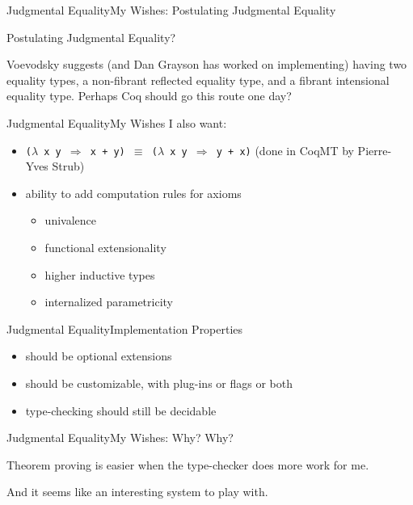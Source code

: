 \documentclass{beamer}
\begin{document}
\begin{frame}[fragile]{Judgmental Equality}{My Wishes: Postulating Judgmental Equality}
  \Large
  \begin{center}
    Postulating Judgmental Equality?
  \end{center}
  Voevodsky suggests (and Dan Grayson has worked on implementing) having two equality types, a non-fibrant reflected equality type, and a fibrant intensional equality type.  Perhaps Coq should go this route one day?
\end{frame}

\begin{frame}{Judgmental Equality}{My Wishes}
  \Large
  I also want:
  \begin{itemize}
    \item \texttt{($\lambda$ x y $\Longrightarrow$ x + y) $\equiv$ ($\lambda$ x y $\Longrightarrow$ y + x)} (done in CoqMT by Pierre-Yves Strub)
    \item ability to add computation rules for axioms \pause
      \begin{itemize} \large
        \item univalence \pause
        \item functional extensionality \pause
        \item higher inductive types \pause
        \item internalized parametricity
      \end{itemize}
  \end{itemize}
\end{frame}

\begin{frame}{Judgmental Equality}{Implementation Properties}
  \Large
  \begin{itemize}
    \item should be optional extensions \pause
    \item should be customizable, with plug-ins or flags or both \pause
    \item type-checking should still be decidable
  \end{itemize}
\end{frame}

\begin{frame}{Judgmental Equality}{My Wishes: Why?}
  \Large
  Why? \pause
  
  Theorem proving is easier when the type-checker does more work for me. \pause
  
  And it seems like an interesting system to play with.
\end{frame}
\end{document}
